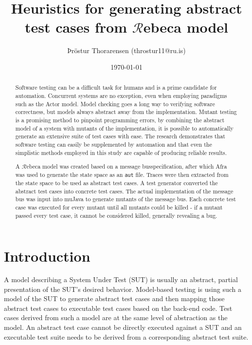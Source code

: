 \documentclass{article}
\begin{document}
\newcommand{\Rebeca}{$\mathcal{R}$ebeca\xspace}


\title{Heuristics for generating abstract test cases from \Rebeca model}
\author{Þröstur Thorarensen (throstur11@ru.is)}
\date{\today}
\maketitle

\begin{abstract}
	Software testing can be a difficult task for humans and is a prime candidate for automation. Concurrent systems are no exception, even when employing paradigms such as the Actor model. Model checking goes a long way to verifying software correctness, but models always abstract away from the implementation. Mutant testing is a promising method to pinpoint programming errors, by combining the abstract model of a system with mutants of the implementation, it is possible to automatically generate an extensive suite of test cases with ease. The research demonstrates that software testing can easily be supplemented by automation and that even the simplistic methods employed in this study are capable of producing reliable results. 

	A \Rebeca model was created based on a message busspecification, after which Afra was used to generate the state space as an \texttt{aut} file. Traces were then extracted from the state space to be used as abstract test cases. A test generator converted the abstract test cases into concrete test cases. The actual implementation of the message bus was input into muJava to generate mutants of the message bus. Each concrete test case was executed for every mutant until all mutants could be killed \-- if a mutant passed every test case, it cannot be considered killed, generally revealing a bug.
\end{abstract}

\newpage
\tableofcontents
\newpage

	\section{Introduction}
		A model describing a System Under Test (SUT) is usually an abstract, partial presentation of the SUT's desired behavior. Model-based testing is using such a model of the SUT to generate abstract test cases and then mapping those abstract test cases to executable test cases based on the back-end code. Test cases derived from such a model are at the same level of abstraction as the model. An abstract test case cannot be directly executed against a SUT and an executable test suite needs to be derived from a corresponding abstract test suite.
\end{document}
